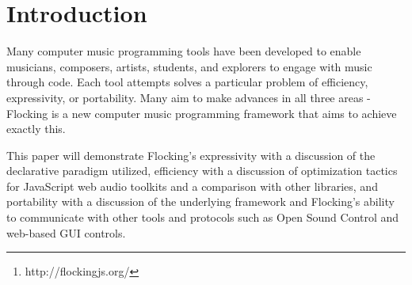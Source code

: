 \documentclass{article}
\title{\papertitle}
\begin{document}
\sloppy
%
\capstartfalse
\maketitle
\capstarttrue
%
\begin{abstract}
Flocking\footnote{http://flockingjs.org/} is a framework for audio synthesis and music composition written in JavaScript. It takes a unique approach to solving several of the common architectural problems faced by computer music environments, emphasizing a declarative style that is closely aligned with the principles of the web.

In Flocking, instruments and scores are defined as JavaScript Object Notation (JSON) objects. JSON is a subset of the JavaScript language that is used widely across the web for exchanging data. Flocking's goal is to enable the growth of an ecosystem of tools that can easily parse and understand the logic and semantics of digital instruments by representing the basic building blocks of synthesis declaratively,. This is particularly useful for supporting generative composition (where programs generate new instruments and scores algorithmically), graphical tools (for programmers and non-programmers alike to collaborate), and new modes of social programming that allow musicians to easily adapt, extend, and rework existing instruments without having to ``fork" their code.

Flocking provides a robust, optimized, and well-tested architecture that explicitly supports extensibility and long-term growth. Flocking runs in nearly any modern JavaScript environment, including desktop and mobile browsers (Chrome, Firefox, and Safari), as well as on embedded devices with Node.js.

\end{abstract}

\section{Introduction}\label{sec:introduction}

Many computer music programming tools have been developed to enable musicians, composers, artists, students, and explorers to engage with music through code. Each tool attempts solves a particular problem of efficiency, expressivity, or portability. Many aim to make advances in all three areas - Flocking is a new computer music programming framework that aims to achieve exactly this.

This paper will demonstrate Flocking's expressivity with a discussion of the declarative paradigm utilized, efficiency with a discussion of optimization tactics for JavaScript web audio toolkits and a comparison with other libraries, and portability with a discussion of the underlying framework and Flocking's ability to communicate with other tools and protocols such as Open Sound Control and web-based GUI controls.
\end{document}
